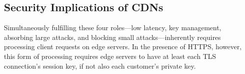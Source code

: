 


 
 



\subsection{Security Implications of CDNs} %

Simultaneously fulfilling these four roles---low latency, key
management, absorbing large attacks, and blocking small
attacks---inherently requires processing client requests on
edge servers.
%
In the presence of HTTPS, however, this form of processing requires
edge servers to have at least each TLS connection's session key, if not
also each customer's private key.

